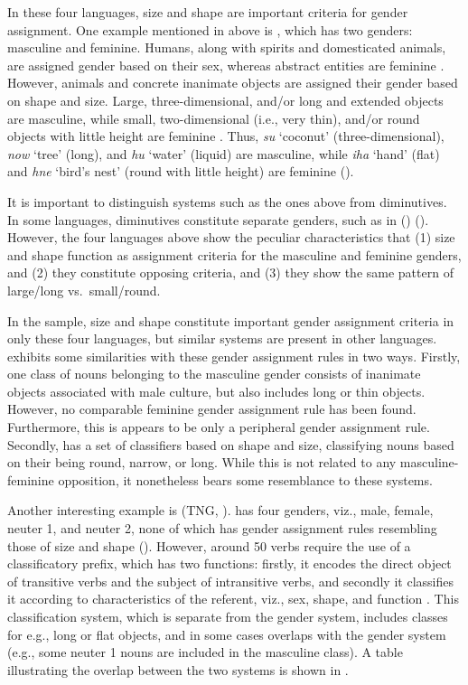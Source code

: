 \documentclass[output=collectionpaper]{langsci/langscibook}
\begin{document}
In these four languages, size and shape are important criteria for gender assignment. One example mentioned in  above is , which has two genders: masculine and feminine. Humans, along with spirits and domesticated animals, are assigned gender based on their sex, whereas abstract entities are feminine \citep[47]{Lock2011}. However, animals and concrete inanimate objects are assigned their gender based on shape and size. Large, three-dimensional, and/or long and extended objects are masculine, while small, two-dimensional (i.e., very thin), and/or round objects with little height are feminine \citep[47]{Lock2011}. Thus, \textit{su} `coconut' (three-dimensional), \textit{now} `tree' (long), and \textit{hu} `water' (liquid) are masculine, while \textit{iha} `hand' (flat) and \textit{hne} `bird's nest' (round with little height) are feminine (\citealt[48--50]{Lock2011}).



It is important to distinguish systems such as the ones above from diminutives. In some languages, diminutives constitute separate genders, such as in  () (\citealt[68--69]{Onishi1994}). However, the four languages above show the peculiar characteristics that (1) size and shape function as assignment criteria for the masculine and feminine genders, and (2) they constitute opposing criteria, and (3) they show the same pattern of large/long vs.\ small/round.


In the sample, size and shape constitute important gender assignment criteria in only these four languages, but similar systems are present in other languages.  exhibits some similarities with these gender assignment rules in two ways. Firstly, one class of nouns belonging to the masculine gender consists of inanimate objects associated with male culture, but also includes long or thin objects. However, no comparable feminine gender assignment rule has been found. Furthermore, this is appears to be only a peripheral gender assignment rule. Secondly,  has a set of classifiers based on shape and size, classifying nouns based on their being round, narrow, or long. While this is not related to any masculine-feminine opposition, it nonetheless bears some resemblance to these systems.


Another interesting example is  (TNG, ).  has four genders, viz., male, female, neuter 1, and neuter 2, none of which has gender assignment rules resembling those of size and shape (\citealt[171--176]{Fedden2011}). However, around 50 verbs require the use of a classificatory prefix, which has two functions: firstly, it encodes the direct object of transitive verbs and the subject of intransitive verbs, and secondly it classifies it according to characteristics of the referent, viz., sex, shape, and function \citep[185]{Fedden2011}. This classification system, which is separate from the gender system, includes classes for e.g., long or flat objects, and in some cases overlaps with the gender system (e.g., some neuter 1 nouns are included in the masculine class). A table illustrating the overlap between the two systems is shown in .
\end{document}
